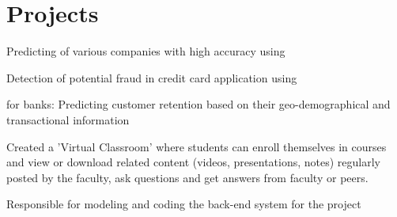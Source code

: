 \documentclass[]{deedy-resume-openfont}
\begin{document}
\hfill
\begin{minipage}[t]{0.66\textwidth}


\section{Projects}


\href{https://github.com/Ellusionists/Deep-Learning-Models}{}
\vspace{\topsep} %
\begin{tightemize}
\item Predicting  of various companies with high accuracy \space using   %
\item Detection of potential fraud in credit card application using 
\item  {} for banks: Predicting customer retention based on their geo-demographical and transactional information
\end{tightemize}
\sectionsep

\href{https://github.com/Ellusionists/VirtualClassroom}{}
\begin{tightemize}
\item Created a 'Virtual Classroom' where students can enroll themselves in courses and view or download related content (videos, presentations, notes) regularly posted by the faculty, ask questions and get answers from faculty or peers.
\item Responsible for modeling and coding the back-end system for the project
\end{tightemize}
\sectionsep


\end{minipage}
\end{document}
